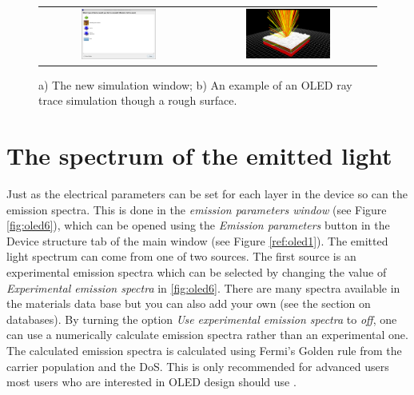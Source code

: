 \begin{figure}[H]
\centering
\begin{tabular}{ c c }

\includegraphics[width=0.5\textwidth,height=0.4\textwidth]{./images/oled/oled_new_sim.png}

&
\includegraphics[width=0.5\textwidth,height=0.4\textwidth]{./images/oled/complex.png}

\\
\end{tabular}
\caption{a) The new simulation window; b) An example of an OLED ray trace simulation though a rough surface.}
\label{fig:oled5}
\end{figure}


\section{The spectrum of the emitted light}
Just as the electrical parameters can be set for each layer in the device so can the emission spectra. This is done in the \emph{emission parameters window} (see Figure \ref{fig:oled6}), which can be opened using the \emph{Emission parameters} button in the Device structure tab of the main window (see Figure \ref{ref:oled1}).  The emitted light spectrum can come from one of two sources. The first source is an experimental emission spectra which can be selected by changing the value of \emph{Experimental emission spectra} in \ref{fig:oled6}.  There are many spectra available in the materials data base but you can also add your own (see the section on databases).  By turning the option \emph{Use experimental emission spectra} to \emph{off}, one can use a numerically calculate emission spectra rather than an experimental one. The calculated emission spectra is calculated using Fermi's Golden rule from the carrier population and the DoS. This is only recommended for advanced users most users who are interested in OLED design should use .

